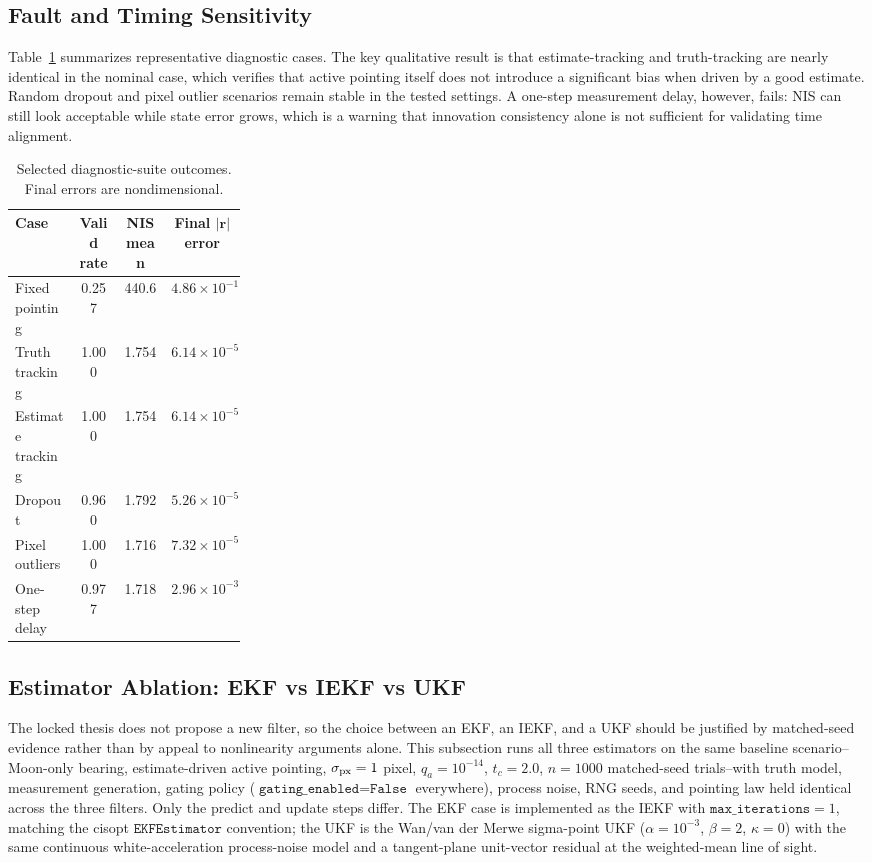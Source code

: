 \documentclass[10pt,twocolumn]{article}
\newcommand{\vect}[1]{\mathbf{#1}}
\begin{document}
\subsection{Fault and Timing Sensitivity}
Table~\ref{tab:vv} summarizes representative diagnostic cases.  The key qualitative result is that estimate-tracking and truth-tracking are nearly identical in the nominal case, which verifies that active pointing itself does not introduce a significant bias when driven by a good estimate.  Random dropout and pixel outlier scenarios remain stable in the tested settings.  A one-step measurement delay, however, fails: NIS can still look acceptable while state error grows, which is a warning that innovation consistency alone is not sufficient for validating time alignment.

\begin{table}[t]
\centering
\caption{Selected diagnostic-suite outcomes.  Final errors are nondimensional.}
\label{tab:vv}
\scriptsize
\begin{tabular}{@{}p{0.27\linewidth}ccc@{}}
\toprule
Case & Valid rate & NIS mean & Final $|\vect{r}|$ error \\
\midrule
Fixed pointing & 0.257 & 440.6 & $4.86\times10^{-1}$ \\
Truth tracking & 1.000 & 1.754 & $6.14\times10^{-5}$ \\
Estimate tracking & 1.000 & 1.754 & $6.14\times10^{-5}$ \\
Dropout & 0.960 & 1.792 & $5.26\times10^{-5}$ \\
Pixel outliers & 1.000 & 1.716 & $7.32\times10^{-5}$ \\
One-step delay & 0.977 & 1.718 & $2.96\times10^{-3}$ \\
\bottomrule
\end{tabular}
\end{table}

\subsection{Estimator Ablation: EKF vs IEKF vs UKF}
\label{sec:verif-estimator-ablation}
The locked thesis does not propose a new filter, so the choice between an EKF, an IEKF, and a UKF should be justified by matched-seed evidence rather than by appeal to nonlinearity arguments alone.  This subsection runs all three estimators on the same baseline scenario--Moon-only bearing, estimate-driven active pointing, $\sigma_{\rm px}=1$ pixel, $q_a=10^{-14}$, $t_c=2.0$, $n=1000$ matched-seed trials--with truth model, measurement generation, gating policy ($\texttt{gating\_enabled}=\texttt{False}$ everywhere), process noise, RNG seeds, and pointing law held identical across the three filters.  Only the predict and update steps differ.  The EKF case is implemented as the IEKF with $\texttt{max\_iterations}=1$, matching the cisopt $\texttt{EKFEstimator}$ convention; the UKF is the Wan/van der Merwe sigma-point UKF ($\alpha=10^{-3}$, $\beta=2$, $\kappa=0$) with the same continuous white-acceleration process-noise model and a tangent-plane unit-vector residual at the weighted-mean line of sight.
\end{document}
